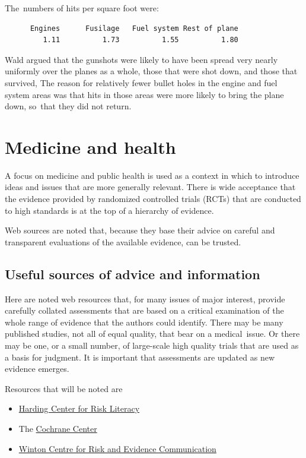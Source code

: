 \documentclass[
  10pt,
  b5paper]{book}
\providecommand{\tightlist}{%
  \setlength{\itemsep}{0pt}\setlength{\parskip}{0pt}}
\begin{document}
The~numbers of hits per square foot were:

\begin{verbatim}
      Engines      Fusilage   Fuel system Rest of plane 
         1.11          1.73          1.55          1.80 
\end{verbatim}

Wald argued that the gunshots were likely to have been spread
very nearly uniformly over the planes as a whole, those that
were shot down, and those that survived, The reason for relatively
fewer bullet holes in the engine and fuel system areas was that
hits in those areas were more likely to bring the plane down,
so~that they did not return.

\hypertarget{medicine-and-health}{%
\chapter{Medicine and health}\label{medicine-and-health}}

A focus on medicine and public health is used as a context in which to
introduce ideas and issues that are more generally relevant. There is
wide acceptance that the evidence provided by randomized controlled
trials (RCTs) that are conducted to high standards is at the top of a
hierarchy of evidence.

Web sources are noted that, because they base their advice on careful
and transparent evaluations of the available evidence, can be trusted.

\hypertarget{useful-sources-of-advice-and-information}{%
\section{Useful sources of advice and information}\label{useful-sources-of-advice-and-information}}

Here are noted web resources that, for many issues of major interest,
provide carefully collated assessments that are based on a critical
examination of the whole range of evidence that the authors could
identify. There may be many published studies, not all of equal quality,
that bear on a medical~issue. Or there may be one, or a small number, of
large-scale high quality trials that are used as a basis for judgment.
It is important that assessments are updated as new evidence emerges.

Resources that will be noted are

\begin{itemize}
\tightlist
\item
  \href{https://www.hardingcenter.de/en}{Harding Center for Risk Literacy}
\item
  The \href{https://www.cochrane.org/}{Cochrane Center}
\item
  \href{https://wintoncentre.maths.cam.ac.uk/}{Winton Centre for Risk and Evidence
  Communication}
\end{itemize}
\end{document}
